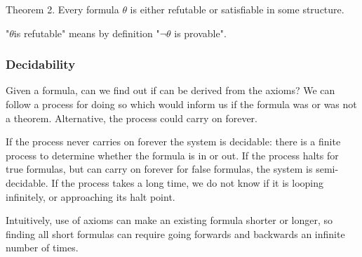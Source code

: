 Theorem 2. Every formula \(\theta \) is either refutable or satisfiable in some structure.

"\(\theta \)is refutable" means by definition "\(\neg \theta \) is provable".

\subsubsection{Decidability}

Given a formula, can we find out if can be derived from the axioms? We can follow a process for doing so which would inform us if the formula was or was not a theorem. Alternative, the process could carry on forever.

If the process never carries on forever the system is decidable: there is a finite process to determine whether the formula is in or out. If the process halts for true formulas, but can carry on forever for false formulas, the system is semi-decidable. If the process takes a long time, we do not know if it is looping infinitely, or approaching its halt point.

Intuitively, use of axioms can make an existing formula shorter or longer, so finding all short formulas can require going forwards and backwards an infinite number of times.

